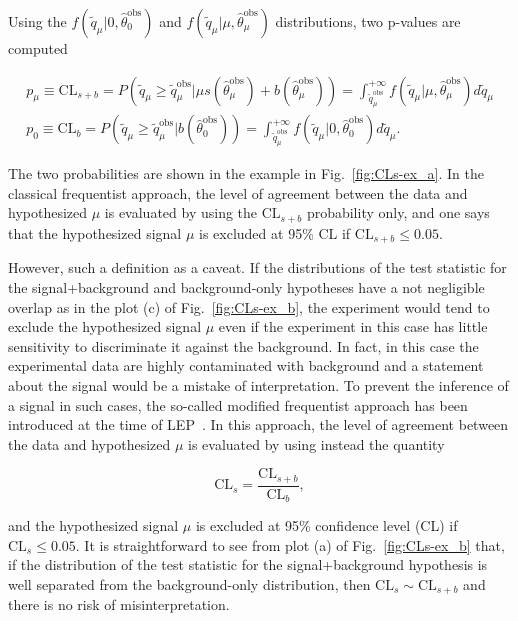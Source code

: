 Using the $f(\tilde{q}_\mu|0,\hat{\theta}_0^\mathrm{obs})$ and $f(\tilde{q}_\mu|\mu,\hat{\theta}_\mu^\mathrm{obs})$ distributions,
two p-values are computed

\begin{equation}
\begin{gathered}
p_\mu \equiv \mathrm{CL}_{s+b} = P(\tilde{q}_\mu \geq \tilde{q}_\mu^\mathrm{obs}|\mu s(\hat{\theta}_\mu^\mathrm{obs}) + b(\hat{\theta}_\mu^\mathrm{obs})) = \int_{\tilde{q}_\mu^\mathrm{obs}}^{+\infty} f(\tilde{q}_\mu|\mu,\hat{\theta}_\mu^\mathrm{obs})d\tilde{q}_\mu \\
p_0 \equiv \mathrm{CL}_{b} = P(\tilde{q}_\mu \geq \tilde{q}_\mu^\mathrm{obs}|b(\hat{\theta}_0^\mathrm{obs})) = \int_{\tilde{q}_\mu^\mathrm{obs}}^{+\infty} f(\tilde{q}_\mu|0,\hat{\theta}_0^\mathrm{obs})d\tilde{q}_\mu.
\end{gathered}
\label{eqn:pvalues}
\end{equation}

The two probabilities are shown in the example in Fig.~\ref{fig:CLs-ex_a}.
In the classical frequentist approach, the level of agreement between the data and hypothesized $\mu$ is evaluated by using the $\mathrm{CL}_{s+b}$ probability only,
and one says that the hypothesized signal $\mu$ is excluded at 95\% CL if $\mathrm{CL}_{s+b} \leq 0.05$.

However, such a definition as a caveat. If the distributions of the test statistic for the signal+background and background-only hypotheses have a not negligible overlap as in the plot (c) of Fig.~\ref{fig:CLs-ex_b},
the experiment would tend to exclude the hypothesized signal $\mu$ even if the experiment in this case has little sensitivity to discriminate it against the background.
In fact, in this case the experimental data are highly contaminated with background and a statement about the signal would be a mistake of interpretation.
To prevent the inference of a signal in such cases, the so-called modified frequentist approach has been introduced at the time of LEP~\cite{CLs1,Junk:1999kv}.
In this approach, the level of agreement between the data and hypothesized $\mu$ is evaluated by using instead the quantity 

\begin{equation}
\mathrm{CL}_s = \frac{\mathrm{CL}_{s+b}}{\mathrm{CL}_b},
\end{equation}

and the hypothesized signal $\mu$ is excluded at 95\% confidence level (CL) if $\mathrm{CL}_s \leq 0.05$.
It is straightforward to see from plot (a) of Fig.~\ref{fig:CLs-ex_b} that, if the distribution of the test statistic for the signal+background hypothesis
is well separated from the background-only distribution, then $\mathrm{CL}_s \sim \mathrm{CL}_{s+b}$ and there is no risk of misinterpretation.

